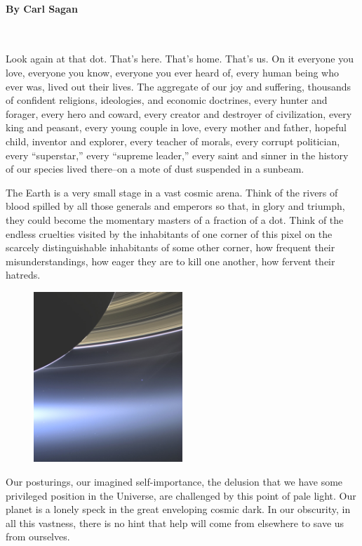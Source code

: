 \documentclass[12pt, openany, letterpaper]{memoir}
\begin{document}
\paragraph{By Carl Sagan}~


Look again at that dot. That's here. That's home. That's us. On it everyone you love, everyone you know, everyone you ever heard of, every human being who ever was, lived out their lives. The aggregate of our joy and suffering, thousands of confident religions, ideologies, and economic doctrines, every hunter and forager, every hero and coward, every creator and destroyer of civilization, every king and peasant, every young couple in love, every mother and father, hopeful child, inventor and explorer, every teacher of morals, every corrupt politician, every “superstar,” every “supreme leader,” every saint and sinner in the history of our species lived there--on a mote of dust suspended in a sunbeam.

The Earth is a very small stage in a vast cosmic arena. Think of the rivers of blood spilled by all those generals and emperors so that, in glory and triumph, they could become the momentary masters of a fraction of a dot. Think of the endless cruelties visited by the inhabitants of one corner of this pixel on the scarcely distinguishable inhabitants of some other corner, how frequent their misunderstandings, how eager they are to kill one another, how fervent their hatreds.

\begin{figure}
	\centering
	\vspace{-0.5em}
	\includegraphics[width=0.5\textwidth]{Pale_Blue_Dot}
\end{figure}

Our posturings, our imagined self-importance, the delusion that we have some privileged position in the Universe, are challenged by this point of pale light. Our planet is a lonely speck in the great enveloping cosmic dark. In our obscurity, in all this vastness, there is no hint that help will come from elsewhere to save us from ourselves.
\end{document}
